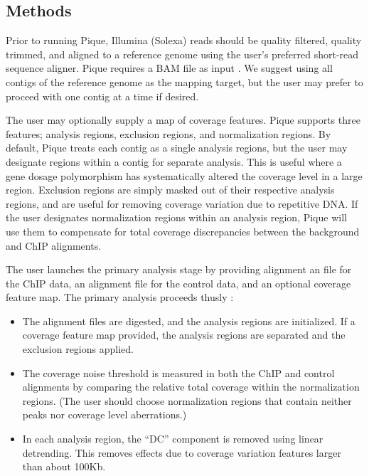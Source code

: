 \documentclass{bioinfo}
\begin{document}
\begin{methods}
\section{Methods}

\noindent Prior to running Pique, Illumina (Solexa) reads should be
quality filtered, quality trimmed, and aligned to a reference genome
using the user's preferred short-read sequence aligner. Pique requires
a BAM file as input \cite{sam_format}. We suggest using all contigs of
the reference genome as the mapping target, but the user may prefer to
proceed with one contig at a time if desired.

The user may optionally supply a map of coverage features. Pique
supports three features; analysis regions, exclusion regions, and
normalization regions. By default, Pique treats each contig as a
single analysis regions, but the user may designate regions within a
contig for separate analysis. This is useful where a gene dosage
polymorphism has systematically altered the coverage level in a large
region. Exclusion regions are simply masked out of their respective
analysis regions, and are useful for removing coverage variation due
to repetitive DNA. If the user designates normalization regions within
an analysis region, Pique will use them to compensate for total coverage
discrepancies between the background and ChIP alignments.

The user launches the primary analysis stage by providing alignment an
file for the ChIP data, an alignment file for the control data, and an
optional coverage feature map. The primary analysis proceeds thusly :

\begin{itemize}

\item The alignment files are digested, and the analysis regions are
  initialized. If a coverage feature map provided, the analysis
  regions are separated and the exclusion regions applied.

\item The coverage noise threshold is measured in both the ChIP and
  control alignments by comparing the relative total coverage within
  the normalization regions. (The user should choose normalization
  regions that contain neither peaks nor coverage level aberrations.)

\item In each analysis region, the ``DC'' component is removed using
  linear detrending. This removes effects due to coverage variation
  features larger than about 100Kb.


\end{itemize}
\end{methods}
\end{document}
